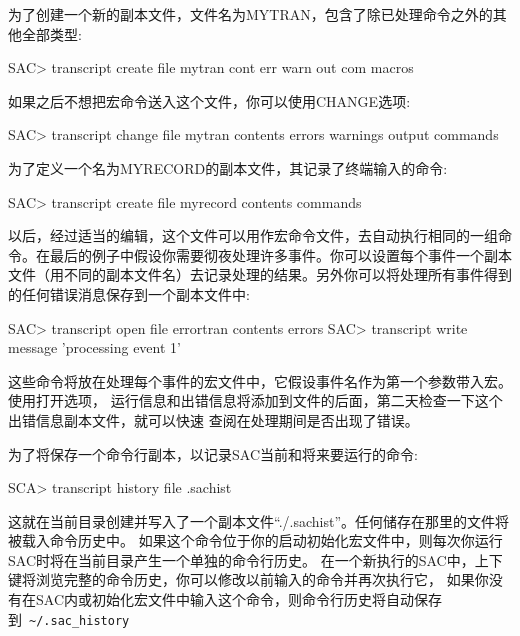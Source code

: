 为了创建一个新的副本文件，文件名为MYTRAN，包含了除已处理命令之外的其他全部类型:
\begin{SACCode}
SAC> transcript create file mytran cont err warn out com macros
\end{SACCode}

如果之后不想把宏命令送入这个文件，你可以使用CHANGE选项:
\begin{SACCode}
SAC> transcript change file mytran contents errors warnings output commands
\end{SACCode}

为了定义一个名为MYRECORD的副本文件，其记录了终端输入的命令:
\begin{SACCode}
SAC> transcript create file myrecord contents commands
\end{SACCode}

以后，经过适当的编辑，这个文件可以用作宏命令文件，去自动执行相同的一组命令。在最后的例子中假设你需要彻夜处理许多事件。你可以设置每个事件一个副本文件（用不同的副本文件名）去记录处理的结果。另外你可以将处理所有事件得到的任何错误消息保存到一个副本文件中:
\begin{SACCode}
SAC> transcript open file errortran contents errors
SAC> transcript write message 'processing event 1'
\end{SACCode}

这些命令将放在处理每个事件的宏文件中，它假设事件名作为第一个参数带入宏。使用打开选项，
运行信息和出错信息将添加到文件的后面，第二天检查一下这个出错信息副本文件，就可以快速
查阅在处理期间是否出现了错误。

为了将保存一个命令行副本，以记录SAC当前和将来要运行的命令:
\begin{SACCode}
SCA> transcript history file .sachist
\end{SACCode}
这就在当前目录创建并写入了一个副本文件``./.sachist''。任何储存在那里的文件将被载入命令历史中。
如果这个命令位于你的启动初始化宏文件中，则每次你运行SAC时将在当前目录产生一个单独的命令行历史。
在一个新执行的SAC中，上下键将浏览完整的命令历史，你可以修改以前输入的命令并再次执行它，
如果你没有在SAC内或初始化宏文件中输入这个命令，则命令行历史将自动保存到~\lstinline{~/.sac_history}

